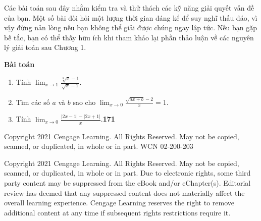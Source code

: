 \begin{minipage}[t]{0.73\textwidth}
    \vspace{4pt}
    Các bài toán sau đây nhằm kiểm tra và thử thách các kỹ năng giải quyết vấn đề của bạn. Một số bài đòi hỏi một lượng thời gian đáng kể để suy nghĩ thấu đáo, vì vậy đừng nản lòng nếu bạn không thể giải được chúng ngay lập tức. Nếu bạn gặp bế tắc, bạn có thể thấy hữu ích khi tham khảo lại phần thảo luận về các nguyên lý giải toán sau Chương 1.
\end{minipage}

\vspace{12pt}

\noindent
\begin{minipage}[t]{0.24\textwidth}
    \vspace{0pt}%
    \begin{tcolorbox}[
        colback=pillgray,
        colframe=pillgray,
        arc=3.2mm,
        auto outer arc,
        boxrule=0pt,
        left=8pt,
        right=8pt,
        top=3.5pt,
        bottom=3.5pt,
        boxsep=0pt,
        width=2.5cm,
        halign=center
    ]
        {\fontsize{10.5}{12}\selectfont\bfseries\sffamily\color{stewartpurple}Bài toán}
    \end{tcolorbox}
\end{minipage}%
\hfill
\begin{minipage}[t]{0.73\textwidth}
    \vspace{0pt}%
    \begin{enumerate}[label=\textbf{\arabic*.}, leftmargin=16pt, itemsep=7pt, topsep=0pt, parsep=0pt]
        \item Tính $\displaystyle\lim_{x \to 1} \frac{\sqrt[3]{x} - 1}{\sqrt{x} - 1}$.
        \item Tìm các số $a$ và $b$ sao cho $\displaystyle\lim_{x \to 0} \frac{\sqrt{ax + b} - 2}{x} = 1$.
        \item Tính $\displaystyle\lim_{x \to 0} \frac{|2x - 1| - |2x + 1|}{x}$.\hfill{\fontsize{11}{13}\selectfont\textbf{\textsf{171}}}
    \end{enumerate}
\end{minipage}

\vfill
\begin{center}
    {\fontsize{5.5}{6.5}\selectfont\color{black!75}
    Copyright 2021 Cengage Learning. All Rights Reserved. May not be copied, scanned, or duplicated, in whole or in part. WCN 02-200-203\par\vspace{1pt}
    Copyright 2021 Cengage Learning. All Rights Reserved. May not be copied, scanned, or duplicated, in whole or in part. Due to electronic rights, some third party content may be suppressed from the eBook and/or eChapter(s). Editorial review has deemed that any suppressed content does not materially affect the overall learning experience. Cengage Learning reserves the right to remove additional content at any time if subsequent rights restrictions require it.\par}
\end{center}
